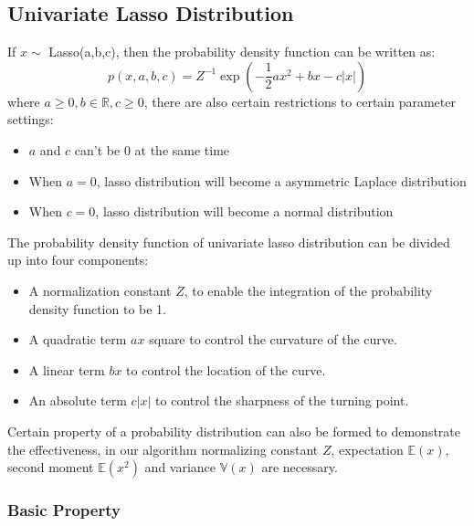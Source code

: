 \subsection{Univariate Lasso Distribution}
If $x \sim $ Lasso(a,b,c), then the probability density function can be written as:
\begin{equation}
	p(x,a,b,c) = Z^{-1}\exp(-\frac{1}{2}ax^2+bx-c|x|)
\end{equation}
where $a \geq 0, b \in \mathbb{R}, c \geq 0$, there are also certain restrictions to certain parameter settings:
\begin{itemize}
	\item $a$ and $c$ can't be 0 at the same time
	\item When $a = 0$, lasso distribution will become a asymmetric Laplace distribution
	\item When $c = 0$, lasso distribution will become a normal distribution
\end{itemize}
The probability density function of univariate lasso distribution can be divided up into four components:
\begin{itemize}
	\item A normalization constant $Z$, to enable the integration of the probability density function to be 1.
	\item A quadratic term $ax$ square to control the curvature of the curve.
	\item A linear term $bx$ to control the location of the curve.
	\item An absolute term $c|x|$ to control the sharpness of the turning point.
\end{itemize} 
Certain property of a probability distribution can also be formed to demonstrate the effectiveness, in our algorithm normalizing constant $Z$, expectation $\mathbb{E}(x)$, second moment $\mathbb{E}(x^2)$ and variance $\mathbb{V}(x)$ are necessary.

\subsubsection{Basic Property}
